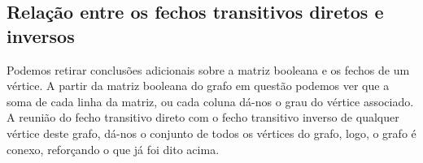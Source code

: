 \subsection{ Relação entre os fechos transitivos diretos e inversos }
Podemos retirar conclusões adicionais sobre a matriz booleana e os fechos de um vértice. A partir da 
matriz booleana do grafo em questão podemos ver que a soma de cada linha da matriz, ou cada coluna dá-nos o 
grau do vértice associado.\\
A reunião do fecho transitivo direto com o fecho transitivo inverso de qualquer vértice deste grafo, 
dá-nos o conjunto de todos os vértices do grafo, logo, o grafo é conexo, reforçando o que já foi dito acima.